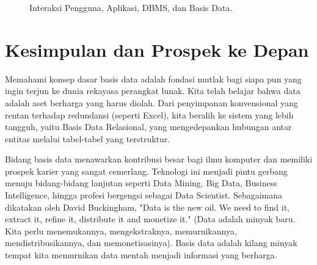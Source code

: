 \documentclass[11pt,a4paper]{article}
\begin{document}
\begin{figure}[H]
	\centering
	\caption{Interaksi Pengguna, Aplikasi, DBMS, dan Basis Data.}
	\label{fig:dbms_flow}
\end{figure}

\section{Kesimpulan dan Prospek ke Depan}

Memahami konsep dasar basis data adalah fondasi mutlak bagi siapa pun yang ingin terjun ke dunia rekayasa perangkat lunak. Kita telah belajar bahwa data adalah aset berharga yang harus diolah. Dari penyimpanan konvensional yang rentan terhadap redundansi (seperti Excel), kita beralih ke sistem yang lebih tangguh, yaitu Basis Data Relasional, yang mengedepankan hubungan antar entitas melalui tabel-tabel yang terstruktur.

Bidang basis data menawarkan kontribusi besar bagi ilmu komputer dan memiliki prospek karier yang sangat cemerlang. Teknologi ini menjadi pintu gerbang menuju bidang-bidang lanjutan seperti Data Mining, Big Data, Business Intelligence, hingga profesi bergengsi sebagai Data Scientist. Sebagaimana dikatakan oleh David Buckingham, "Data is the new oil. We need to find it, extract it, refine it, distribute it and monetize it." (Data adalah minyak baru. Kita perlu menemukannya, mengekstraknya, memurnikannya, mendistribusikannya, dan memonetisasinya). Basis data adalah kilang minyak tempat kita memurnikan data mentah menjadi informasi yang berharga.
\end{document}
